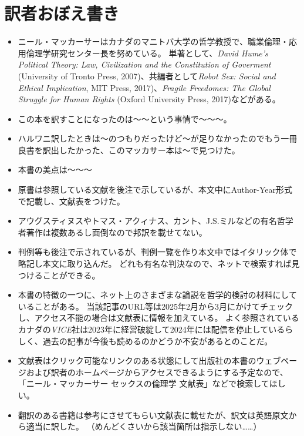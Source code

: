 \documentclass[paper=a4,book,openany]{jlreq}
\begin{document}
\chapter*{訳者おぼえ書き}
{}
\begin{itemize}
\item ニール・マッカーサーはカナダのマニトバ大学の哲学教授で、職業倫理・応用倫理学研究センター長を努めている。
単著として、\emph{David Hume's Political Theory: Law, Civilization and the Constitution of Goverment} (University of Tronto Press, 2007)、共編者として\emph{Robot Sex: Social and Ethical Implication}, MIT Press, 2017)、\emph{Fragile Freedomes: The Global Struggle for Human Rights} (Oxford University Press, 2017)などがある。

\item この本を訳すことになったのは〜〜という事情で〜〜〜。

\item ハルワニ訳したときは〜のつもりだったけど〜が足りなかったのでもう一冊良書を訳出したかった、このマッカサー本は〜で見つけた。
\item 本書の美点は〜〜〜
\item 原書は参照している文献を後注で示しているが、本文中にAuthor-Year形式で記載し、文献表をつけた。
\item アウグスティヌスやトマス・アクィナス、カント、J.S.ミルなどの有名哲学者著作は複数あるし面倒なので邦訳を載せてない。
\item 判例等も後注で示されているが、判例一覧を作り本文中ではイタリック体で略記し本文に取り込んだ。
どれも有名な判決なので、ネットで検索すれば見つけることができる。
\item 本書の特徴の一つに、ネット上のさまざまな論説を哲学的検討の材料にしていることがある。
当該記事のURL等は2025年2月から3月にかけてチェックし、アクセス不能の場合は文献表に情報を加えている。
よく参照されているカナダの\emph{VICE}社は2023年に経営破綻して2024年には配信を停止しているらしく、過去の記事が今後も読めるのかどうか不安があるとのことだ。

\item 文献表はクリック可能なリンクのある状態にして出版社の本書のウェブページおよび訳者のホームページからアクセスできるようにする予定なので、「ニール・マッカーサー セックスの倫理学 文献表」などで検索してほしい。

\item 翻訳のある書籍は参考にさせてもらい文献表に載せたが、訳文は英語原文から適当に訳した。
（めんどくさいから該当箇所は指示しない……）


\end{itemize}
\end{document}
